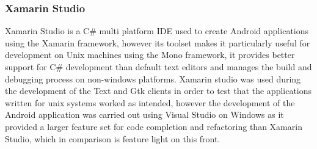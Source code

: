 \documentclass{article}
\begin{document}
\subsubsection{Xamarin Studio}
Xamarin Studio is a C\# multi platform IDE used to create Android applications using the Xamarin framework, however its toolset makes it particularly useful for development on Unix machines using the Mono framework, it provides better support for C\# development than default text editors and manages the build and debugging process on non-windows platforms. Xamarin studio was used during the development of the Text and Gtk clients in order to test that the applications written for unix systems worked as intended, however the development of the Android application was carried out using Visual Studio on Windows as it provided a larger feature set for code completion and refactoring than Xamarin Studio, which in comparison is feature light on this front.
\end{document}
